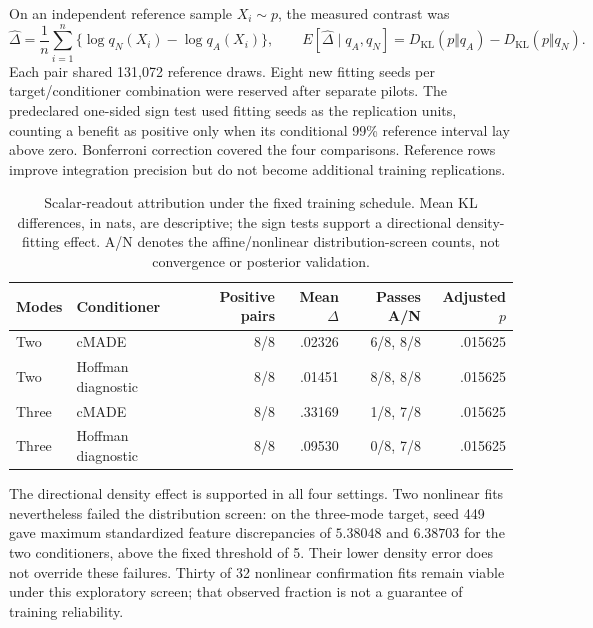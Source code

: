 On an independent reference sample $X_i\sim p$, the measured contrast was
\begin{equation}
 \widehat\Delta=\frac1n\sum_{i=1}^n
    \{\log q_N(X_i)-\log q_A(X_i)\},
 \qquad
 E[\widehat\Delta\mid q_A,q_N]
   =D_{\mathrm{KL}}(p\Vert q_A)-D_{\mathrm{KL}}(p\Vert q_N).
 \label{eq:neutra-attribution-kl-contrast}
\end{equation}
Each pair shared 131,072 reference draws. Eight new fitting seeds per
target/conditioner combination were reserved after separate pilots. The
predeclared one-sided sign test used fitting seeds as the replication units,
counting a benefit as positive only when its conditional 99\% reference
interval lay above zero. Bonferroni correction covered the four comparisons.
Reference rows improve integration precision but do not become additional
training replications.

\begin{table}[htbp]
 \centering\small
 \begin{tabular}{llrrrr}
  \toprule
  Modes & Conditioner & Positive pairs & Mean $\widehat\Delta$ & Passes A/N & Adjusted $p$\\
  \midrule
  Two & cMADE & 8/8 & .02326 & 6/8, 8/8 & .015625\\
  Two & Hoffman diagnostic & 8/8 & .01451 & 8/8, 8/8 & .015625\\
  Three & cMADE & 8/8 & .33169 & 1/8, 7/8 & .015625\\
  Three & Hoffman diagnostic & 8/8 & .09530 & 0/8, 7/8 & .015625\\
  \bottomrule
 \end{tabular}
 \caption{Scalar-readout attribution under the fixed training schedule. Mean
 KL differences, in nats, are descriptive; the sign tests support a directional
 density-fitting effect. A/N denotes the affine/nonlinear distribution-screen
 counts, not convergence or posterior validation.}
 \label{tab:neutra-scalar-attribution}
\end{table}

The directional density effect is supported in all four settings. Two nonlinear
fits nevertheless failed the distribution screen: on the three-mode target,
seed 449 gave maximum standardized feature discrepancies of $5.38048$ and
$6.38703$ for the two conditioners, above the fixed threshold of 5. Their
lower density error does not override these failures. Thirty of 32 nonlinear
confirmation fits remain viable under this exploratory screen; that observed
fraction is not a guarantee of training reliability.

